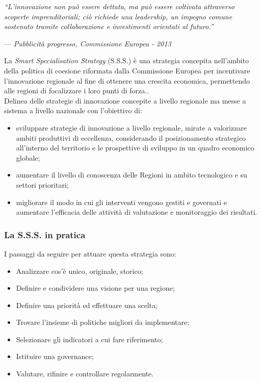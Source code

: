 \begin{flushright}{
	\slshape    
	``L'innovazione non può essere dettata, ma può essere coltivata attraverso scoperte imprenditoriali; ciò richiede una leadership, un impegno comune sostenuto tramite collaborazione e investimenti orientati al futuro.''} 
	
	\medskip
    --- \textit{Pubblicità progresso, Commissione Europea - 2013}
\end{flushright}


\noindent La \textit{Smart Specialisation Strategy} (S.S.S.) è una strategia concepita nell'ambito della politica di coesione riformata dalla Commissione Europea per incentivare l'innovazione regionale al fine di ottenere una crescita economica, permettendo alle regioni di focalizzare i loro punti di forza..\\
Delinea delle strategie di innovazione concepite a livello regionale ma messe a sistema a livello nazionale con l'obiettivo di:
\begin{itemize}
\item sviluppare strategie di innovazione a livello regionale, mirate a valorizzare ambiti produttivi di eccellenza, considerando il posizionamento strategico all'interno del territorio e le prospettive di sviluppo in un quadro economico globale;
\item aumentare il livello di conoscenza delle Regioni in ambito tecnologico e su settori prioritari;
\item migliorare il modo in cui gli interventi vengono gestiti e governati e aumentare l'efficacia delle attività di valutazione e monitoraggio dei risultati.
\end{itemize}
\subsubsection{La S.S.S. in pratica}
I passaggi da seguire per attuare questa strategia sono:
\begin{itemize}
\item Analizzare cos'è unico, originale, storico;
\item Definire e condividere una visione per una regione;
\item Definire una priorità ed effettuare una scelta;
\item Trovare l'insieme di politiche migliori da implementare;
\item Selezionare gli indicatori a cui fare riferimento;
\item Istituire una governance;
\item Valutare, rifinire e controllare regolarmente.
\end{itemize}

